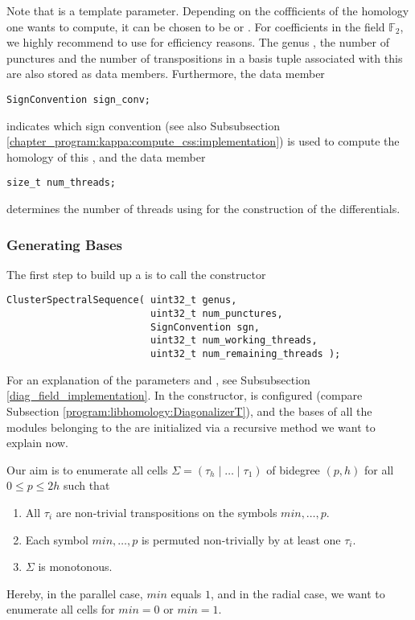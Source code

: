 Note that  is a template parameter. 
Depending on the coffficients of the homology one wants to compute,
it can be chosen to be  or .
For coefficients in the field $\mathbb F_2$, we highly recommend to use  for efficiency reasons.
The genus , the number of punctures  and the number  of transpositions in a basis tuple 
associated with this  are also stored as data members. 
Furthermore, the data member
\begin{lstlisting}
SignConvention sign_conv;
\end{lstlisting}
indicates which sign convention (see also Subsubsection \ref{chapter_program:kappa:compute_css:implementation}) is used to compute the homology of this ,
and the data member
\begin{lstlisting}
size_t num_threads;
\end{lstlisting}
determines the number of threads using for the construction of the differentials.

\subsubsection{Generating Bases}
\label{chapter_program:kappa:css:gen_bases}

The first step to build up a  is to call the constructor
\begin{lstlisting}
ClusterSpectralSequence( uint32_t genus, 
                         uint32_t num_punctures, 
                         SignConvention sgn, 
                         uint32_t num_working_threads, 
                         uint32_t num_remaining_threads );
\end{lstlisting}
For an explanation of the parameters  and , 
see Subsubsection \ref{diag_field_implementation}.
In the constructor,  is configured (compare Subsection \ref{program:libhomology:DiagonalizerT}), 
and the bases of all the modules belonging to the  are initialized 
via a recursive method we want to explain now. 

Our aim is to enumerate all cells $\Sigma = (\tau_h \mid \ldots \mid \tau_1)$ 
of bidegree $(p, h)$ for all $0 \leq p \leq 2h$ such that
\begin{enumerate}
 \item All $\tau_i$ are non-trivial transpositions on the symbols $min, \dotsc, p$.
 \item Each symbol $min, \dotsc, p$ is permuted non-trivially by at least one $\tau_i$.
 \item $\Sigma$ is monotonous.
\end{enumerate}
Hereby, in the parallel case, $min$ equals $1$, and in the radial case, we want to enumerate all cells for $min = 0$ or $min = 1$.

